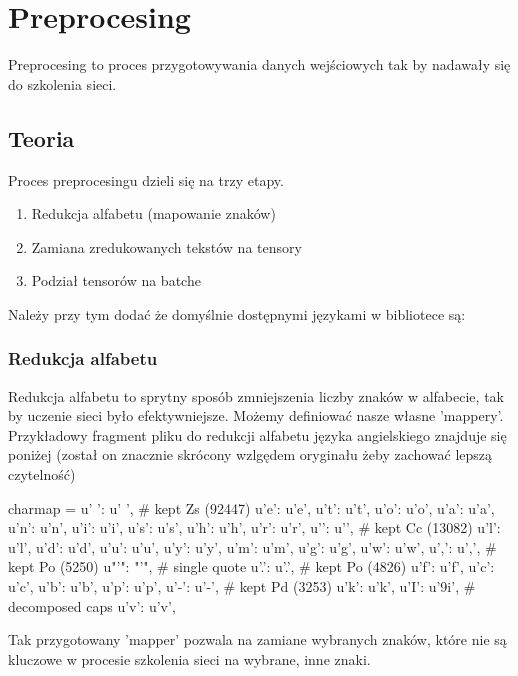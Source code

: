 \newpage
\section{Preprocesing}

Preprocesing to proces przygotowywania danych wejściowych tak by nadawały się do szkolenia sieci.

\subsection{Teoria}

Proces preprocesingu dzieli się na trzy etapy.
\begin{enumerate}
	\item Redukcja alfabetu (mapowanie znaków)
	\item Zamiana zredukowanych tekstów na tensory
	\item Podział tensorów na batche
\end{enumerate}

Należy przy tym dodać że domyślnie dostępnymi językami w bibliotece są:
\languages 


\subsubsection{Redukcja alfabetu}
Redukcja alfabetu to sprytny sposób zmniejszenia liczby znaków w alfabecie, tak by uczenie sieci było
efektywniejsze. Możemy definiować nasze własne 'mappery'. Przykładowy fragment pliku do redukcji alfabetu języka
angielskiego znajduje się poniżej (został on znacznie skrócony wzlgędem oryginału żeby zachować lepszą
czytelność)

\begin{python}
charmap = {
    u' ': u' ',                 # kept Zs (92447)
    u'e': u'e',
    u't': u't',
    u'o': u'o',
    u'a': u'a',
    u'n': u'n',
    u'i': u'i',
    u's': u's',
    u'h': u'h',
    u'r': u'r',
    u'\n': u'\n',               # kept Cc (13082)
    u'l': u'l',
    u'd': u'd',
    u'u': u'u',
    u'y': u'y',
    u'm': u'm',
    u'g': u'g',
    u'w': u'w',
    u',': u',',                 # kept Po (5250)
    u"'": "'",                  # single quote
    u'.': u'.',                 # kept Po (4826)
    u'f': u'f',
    u'c': u'c',
    u'b': u'b',
    u'p': u'p',
    u'-': u'-',                 # kept Pd (3253)
    u'k': u'k',
    u'I': u'\xb9i',             # decomposed caps
    u'v': u'v',
}
\end{python}

Tak przygotowany 'mapper' pozwala na zamiane wybranych znaków, które nie są kluczowe w procesie 
szkolenia sieci na wybrane, inne znaki.

